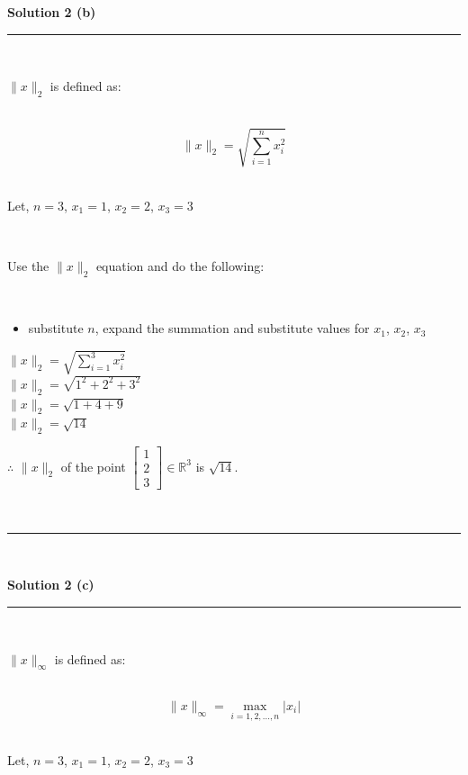 \documentclass{article}
\begin{document}
\newpage

\textbf{Solution 2 (b)}

\noindent\rule{\textwidth}{0.4pt}\\

\parbox{\textwidth}{$\|x\|_2$ is defined as:}\\

$$\|x\|_2 = \sqrt{\sum_{i=1}^{n} x_i^2}$$\\

\parbox{\textwidth}{Let, $n=3$, $x_1 = 1$, $x_2 = 2$, $x_3 = 3$}\\

\parbox{\textwidth}{Use the $\|x\|_2$ equation and do the following:}\\

\begin{itemize}
    \item {substitute $n$, expand the summation and substitute values for $x_1$, $x_2$, $x_3$}
\end{itemize}

$\|x\|_2 = \sqrt{\sum_{i=1}^{3} x_i^2}$\\

$\|x\|_2 = \sqrt{1^2 + 2^2 + 3^2}$\\

$\|x\|_2 = \sqrt{1 + 4 + 9}$\\

$\|x\|_2 = \sqrt{14}$\\

\parbox{\textwidth}{$\therefore$ $\|x\|_2$ of the point $\begin{bmatrix} 1 \\ 2 \\ 3 \end{bmatrix} \in \mathbb{R}^3$  is $\sqrt{14}$.}\\

\noindent\rule{\textwidth}{0.4pt}\\

\newpage

\textbf{Solution 2 (c)}

\noindent\rule{\textwidth}{0.4pt}\\

\parbox{\textwidth}{$\|x\|_{\infty}$ is defined as:}\\

$$\|x\|_{\infty} = \max_{i=1,2,...,n} |x_i|$$\\

\parbox{\textwidth}{Let, $n=3$, $x_1 = 1$, $x_2 = 2$, $x_3 = 3$}\\
\end{document}
